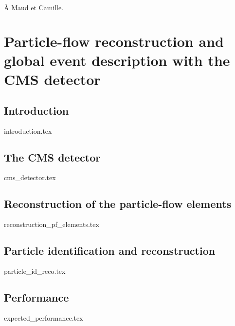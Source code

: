 \documentclass[11pt,twoside,a4paper,tdr]{cms-tdr}
\begin{document}
\newpage

\vspace*{10cm}
À Maud et Camille.

\pagebreak



\chapter{Particle-flow reconstruction and global event description with the CMS detector} 

\pagebreak 

\section{Introduction}
\label{sec:introduction}

{introduction.tex}

\section{The CMS detector }
\label{sec:cms_detector}

{cms_detector.tex}



\section{Reconstruction of the particle-flow elements}
\label{sec:reconstruction_pf_elements}

{reconstruction_pf_elements.tex}


\section{Particle identification and reconstruction}
\label{sec:particle_id_reco}

{particle_id_reco.tex}

\clearpage

\section{Performance}
\label{sec:expected_performance}

{expected_performance.tex}

\clearpage 
\end{document}
